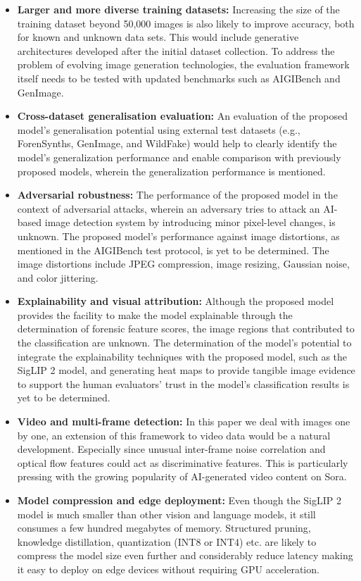 \begin{itemize}
    \item \textbf{Larger and more diverse training datasets:} Increasing the size of the training dataset beyond 50,000 images is also likely to improve accuracy, both for known and unknown data sets. This would include generative architectures developed after the initial dataset collection. To address the problem of evolving image generation technologies, the evaluation framework itself needs to be tested with updated benchmarks such as AIGIBench and GenImage.

    \item \textbf{Cross-dataset generalisation evaluation:} An evaluation of the proposed model's generalisation potential using external test datasets (e.g., ForenSynths, GenImage, and WildFake) would help to clearly identify the model's generalization performance and enable comparison with previously proposed models, wherein the generalization performance is mentioned.

    \item \textbf{Adversarial robustness:} The performance of the proposed model in the context of adversarial attacks, wherein an adversary tries to attack an AI-based image detection system by introducing minor pixel-level changes, is unknown. The proposed model's performance against image distortions, as mentioned in the AIGIBench test protocol, is yet to be determined. The image distortions include JPEG compression, image resizing, Gaussian noise, and color jittering.

    \item \textbf{Explainability and visual attribution:} Although the proposed model provides the facility to make the model explainable through the determination of forensic feature scores, the image regions that contributed to the classification are unknown. The determination of the model's potential to integrate the explainability techniques with the proposed model, such as the SigLIP 2 model, and generating heat maps to provide tangible image evidence to support the human evaluators' trust in the model's classification results is yet to be determined.

    \item \textbf{Video and multi-frame detection:} In this paper we deal with images one by one, an extension of this framework to video data would be a natural development. Especially since unusual inter-frame noise correlation and optical flow features could act as discriminative features. This is particularly pressing with the growing popularity of AI-generated video content on Sora.

    \item \textbf{Model compression and edge deployment:} Even though the SigLIP 2 model is much smaller than other vision and language models, it still consumes a few hundred megabytes of memory. Structured pruning, knowledge distillation, quantization (INT8 or INT4) etc. are likely to compress the model size even further and considerably reduce latency making it easy to deploy on edge devices without requiring GPU acceleration.
\end{itemize}
